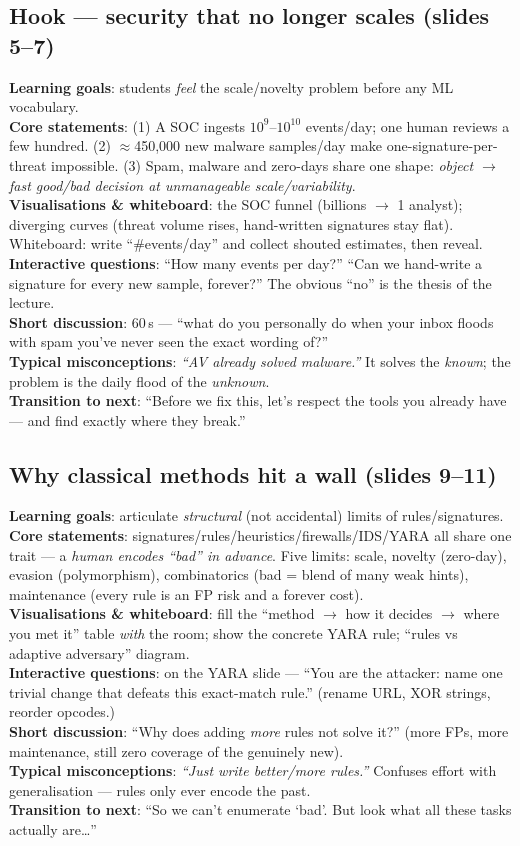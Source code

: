 \documentclass[11pt,a4paper]{article}
\newcommand{\obj}{\textbf{\color{accent}Learning goals}}
\newcommand{\core}{\textbf{\color{accent}Core statements}}
\newcommand{\viz}{\textbf{\color{accent}Visualisations \& whiteboard}}
\newcommand{\ask}{\textbf{\color{accent}Interactive questions}}
\newcommand{\disc}{\textbf{\color{accent}Short discussion}}
\newcommand{\misc}{\textbf{\color{bad}Typical misconceptions}}
\newcommand{\trans}{\textbf{\color{mlsig}Transition to next}}
\begin{document}
\subsection{Hook --- security that no longer scales (slides 5--7)}
\obj: students \emph{feel} the scale/novelty problem before any ML vocabulary.\\
\core: (1) A SOC ingests $10^9$--$10^{10}$ events/day; one human reviews a few
hundred. (2) $\approx$450{,}000 new malware samples/day make one-signature-per-threat
impossible. (3) Spam, malware and zero-days share one shape: \emph{object $\to$
fast good/bad decision at unmanageable scale/variability}.\\
\viz: the SOC funnel (billions $\to$ 1 analyst); diverging curves (threat volume
rises, hand-written signatures stay flat). Whiteboard: write ``\#events/day'' and
collect shouted estimates, then reveal.\\
\ask: ``How many events per day?''  ``Can we hand-write a signature for every new
sample, forever?'' The obvious ``no'' is the thesis of the lecture.\\
\disc: 60\,s --- ``what do you personally do when your inbox floods with spam
you've never seen the exact wording of?''\\
\misc: \emph{``AV already solved malware.''} It solves the \emph{known}; the
problem is the daily flood of the \emph{unknown}.\\
\trans: ``Before we fix this, let's respect the tools you already have --- and
find exactly where they break.''

\subsection{Why classical methods hit a wall (slides 9--11)}
\obj: articulate \emph{structural} (not accidental) limits of rules/signatures.\\
\core: signatures/rules/heuristics/firewalls/IDS/YARA all share one trait --- a
\emph{human encodes ``bad'' in advance}. Five limits: scale, novelty (zero-day),
evasion (polymorphism), combinatorics (bad = blend of many weak hints),
maintenance (every rule is an FP risk and a forever cost).\\
\viz: fill the ``method $\to$ how it decides $\to$ where you met it'' table
\emph{with} the room; show the concrete YARA rule; ``rules vs adaptive adversary''
diagram.\\
\ask: on the YARA slide --- ``You are the attacker: name one trivial change that
defeats this exact-match rule.'' (rename URL, XOR strings, reorder opcodes.)\\
\disc: ``Why does adding \emph{more} rules not solve it?'' (more FPs, more
maintenance, still zero coverage of the genuinely new).\\
\misc: \emph{``Just write better/more rules.''} Confuses effort with
generalisation --- rules only ever encode the past.\\
\trans: ``So we can't enumerate `bad'. But look what all these tasks actually
are\ldots''
\end{document}
